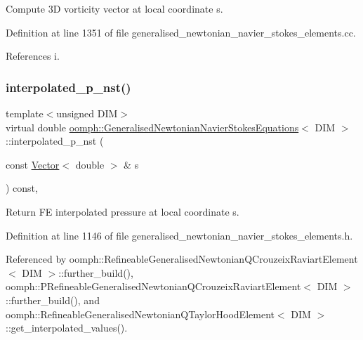 Compute 3D vorticity vector at local coordinate s. 



Definition at line 1351 of file generalised\+\_\+newtonian\+\_\+navier\+\_\+stokes\+\_\+elements.\+cc.



References i.

\mbox{\label{classoomph_1_1GeneralisedNewtonianNavierStokesEquations_ae8667c5b11f023c60dda98329f9c13f3}} 
\subsubsection{\texorpdfstring{interpolated\+\_\+p\+\_\+nst()}{interpolated\_p\_nst()}\hspace{0.1cm}{\footnotesize\ttfamily [1/2]}}
{\footnotesize\ttfamily template$<$unsigned D\+IM$>$ \\
virtual double \hyperlink{classoomph_1_1GeneralisedNewtonianNavierStokesEquations}{oomph\+::\+Generalised\+Newtonian\+Navier\+Stokes\+Equations}$<$ D\+IM $>$\+::interpolated\+\_\+p\+\_\+nst (\begin{DoxyParamCaption}\item[{const \hyperlink{classoomph_1_1Vector}{Vector}$<$ double $>$ \&}]{s }\end{DoxyParamCaption}) const\hspace{0.3cm}{\ttfamily [inline]}, {\ttfamily [virtual]}}



Return FE interpolated pressure at local coordinate s. 



Definition at line 1146 of file generalised\+\_\+newtonian\+\_\+navier\+\_\+stokes\+\_\+elements.\+h.



Referenced by oomph\+::\+Refineable\+Generalised\+Newtonian\+Q\+Crouzeix\+Raviart\+Element$<$ D\+I\+M $>$\+::further\+\_\+build(), oomph\+::\+P\+Refineable\+Generalised\+Newtonian\+Q\+Crouzeix\+Raviart\+Element$<$ D\+I\+M $>$\+::further\+\_\+build(), and oomph\+::\+Refineable\+Generalised\+Newtonian\+Q\+Taylor\+Hood\+Element$<$ D\+I\+M $>$\+::get\+\_\+interpolated\+\_\+values().

